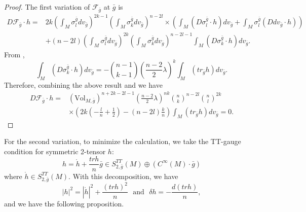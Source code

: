 \documentclass[12pt]{amsart}
\newcommand{\bg}{\bar{g}}
\numberwithin{equation}{section}
\begin{document}
\begin{proof}
    The first variation of $\mathcal{F}_{\bg}$ at $\bg$ is
    \begin{equation*}
    \begin{split}
        D\mathcal{F}_{\bg}\cdot h=
        &2k \left( \int_M \sigma_l^{\bg} dv_{\bg} \right)^{2k-1} \left(\int_M \sigma_k^{\bg} dv_{\bg} \right)^{n-2l} \times \left(\int_M(D\sigma_l^{\bg}\cdot h) dv_{\bg}+\int_M\sigma_l^{\bg} (Ddv_{\bg}\cdot h)\right)\\
        &+ \left(n-2l\right) \left(\int_M \sigma_l^{\bg}dv_{\bg}\right)^{2k} \left(\int_M \sigma_k^{\bg}dv_{\bg}\right)^{n-2l-1}\int_M \left( D\sigma_k^{\bg}\cdot h \right)dv_{\bg}.
    \end{split}
    \end{equation*}
    From ,
    \begin{equation*}
        \int_M \left( D\sigma_k^{\bg}\cdot h \right)dv_{\bg} = -\binom{n-1}{k-1} \left(\frac{n-2}{2}\lambda\right)^k\int_M\left( tr_{\bg}h \right) dv_{\bg}.
    \end{equation*}
    Therefore, combining the above result and  we have
    \begin{equation*}
    \begin{split}
        D\mathcal{F}_{\bg}\cdot h=
        &\left(\mathrm{Vol}_{M,\bg}\right)^{n+2k-2l-1} \left(\frac{n-2}{2}\lambda \right)^{nk}\binom{n}{k}^{n-2l}\binom{n}{l}^{2k}\\
        &\times \left(2k\left(-\frac{l}{n}+\frac{1}{2}\right)-(n-2l)\frac{k}{n} \right) \int_M(tr_{\bg}h) dv_{\bg}=0.
    \end{split}
    \end{equation*}
\end{proof}

For the second variation, to minimize the calculation, we take the TT-gauge condition for symmetric 2-tensor $h$:
\begin{equation*}
    h=\mathring{h}+\frac{trh}{n}\bg\in S^{TT}_{2,\bg}(M)\oplus(C^\infty(M)\cdot\bg)
\end{equation*}
where $\mathring{h}\in S_{2,\bg}^{TT}(M)$. With this decomposition, we have
\begin{equation*}
       |h|^2=|\mathring{h}|^2+\frac{(trh)^2}{n}\ \ \ \mathrm{and}\ \ \  \delta h=-\frac{d(trh)}{n},
\end{equation*}
and we have the following proposition.
\end{document}
